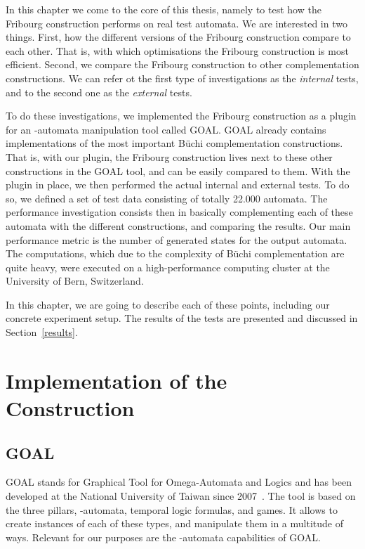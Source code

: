 \minitoc

In this chapter we come to the core of this thesis, namely to test how the Fribourg construction performs on real test automata. We are interested in two things. First, how the different versions of the Fribourg construction compare to each other. That is, with which optimisations the Fribourg construction is most efficient. Second, we compare the Fribourg construction to other complementation constructions. We can refer ot the first type of investigations as the \textit{internal} tests, and to the second one as the \textit{external} tests.

To do these investigations, we implemented the Fribourg construction as a plugin for an \om-automata manipulation tool called GOAL. GOAL already contains implementations of the most important Büchi complementation constructions. That is, with our plugin, the Fribourg construction lives next to these other constructions in the GOAL tool, and can be easily compared to them. With the plugin in place, we then performed the actual internal and external tests. To do so, we defined a set of test data consisting of totally 22.000 automata. The performance investigation consists then in basically complementing each of these automata with the different constructions, and comparing the results. Our main performance metric is the number of generated states for the output automata. The computations, which due to the complexity of Büchi complementation are quite heavy, were executed on a high-performance computing cluster at the University of Bern, Switzerland.

In this chapter, we are going to describe each of these points, including our concrete experiment setup. The results of the tests are presented and discussed in Section~\ref{results}.

\section{Implementation of the Construction}
\subsection{GOAL}
\label{goal}
GOAL stands for Graphical Tool for Omega-Automata and Logics and has been developed at the National University of Taiwan since 2007~\cite{2007_goal,2008_goal_ext}. The tool is based on the three pillars, \om-automata, temporal logic formulas, and games. It allows to create instances of each of these types, and manipulate them in a multitude of ways. Relevant for our purposes are the \om-automata capabilities of GOAL.

